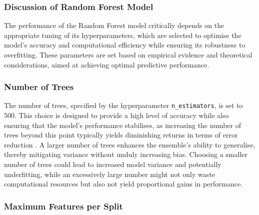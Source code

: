 

\subsubsection*{Discussion of Random Forest Model}

The performance of the Random Forest model critically depends on the appropriate tuning of its hyperparameters, which are selected to optimise the model's accuracy and computational efficiency while ensuring its robustness to overfitting. These parameters are set based on empirical evidence and theoretical considerations, aimed at achieving optimal predictive performance.

\subsubsection*{Number of Trees}

The number of trees, specified by the hyperparameter \texttt{n\_estimators}, is set to 500. This choice is designed to provide a high level of accuracy while also ensuring that the model's performance stabilises, as increasing the number of trees beyond this point typically yields diminishing returns in terms of error reduction \autocite{Medeiros2021ForecastingMethods}. A larger number of trees enhances the ensemble's ability to generalise, thereby mitigating variance without unduly increasing bias. Choosing a smaller number of trees could lead to increased model variance and potentially underfitting, while an excessively large number might not only waste computational resources but also not yield proportional gains in performance.

\subsubsection*{Maximum Features per Split}

